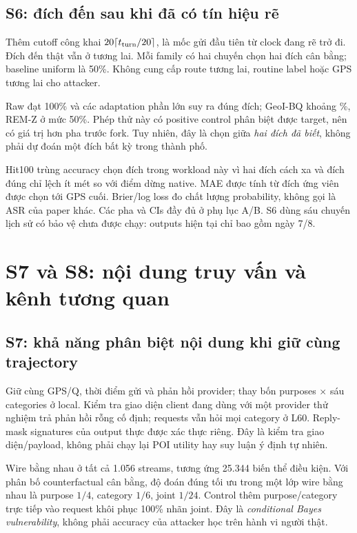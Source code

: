 \documentclass[10pt,a4paper]{article}
\begin{document}
\subsection{S6: đích đến sau khi đã có tín hiệu rẽ}
Thêm cutoff công khai $20\lceil t_{\rm turn}/20\rceil$, là mốc gửi đầu tiên từ clock đang rẽ trở đi.
Đích đến thật vẫn ở tương lai. Mỗi family có hai chuyến chọn hai đích cân bằng; baseline uniform là 50\%.
Không cung cấp route tương lai, routine label hoặc GPS tương lai cho attacker.
\begin{small}\end{small}

Raw đạt 100\% và các adaptation phần lớn suy ra đúng đích; GeoI-BQ khoảng \PrimaryFuture\%,
REM-Z ở mức 50\%. Phép thử này có positive control phân biệt được target, nên có giá trị hơn pha trước fork.
Tuy nhiên, đây là chọn giữa \emph{hai đích đã biết}, không phải dự đoán một đích bất kỳ trong thành phố.

Hit100 trùng accuracy chọn đích trong workload này vì hai đích cách xa và đích đúng chỉ lệch ít mét so
với điểm dừng native. MAE được tính từ đích ứng viên được chọn tới GPS cuối. Brier/log loss đo chất lượng
probability, không gọi là ASR của paper khác. Các pha và CIs đầy đủ ở phụ lục A/B.
S6 dùng sáu chuyến lịch sử có bảo vệ chưa được chạy: outputs hiện tại chỉ bao gồm ngày 7/8.

\clearpage
\section{S7 và S8: nội dung truy vấn và kênh tương quan}
\subsection{S7: khả năng phân biệt nội dung khi giữ cùng trajectory}
Giữ cùng GPS/Q, thời điểm gửi và phản hồi provider; thay bốn purposes $\times$ sáu categories ở local.
Kiểm tra giao diện client đang dùng với một provider thử nghiệm trả phản hồi rỗng cố định;
requests vẫn hỏi mọi category ở L60. Reply-mask signatures của output thực được xác thực riêng.
Đây là kiểm tra giao diện/payload, không phải chạy lại POI utility hay suy luận ý định tự nhiên.
\begin{small}\end{small}

Wire bằng nhau ở tất cả 1.056 streams, tương ứng 25.344 biến thể điều kiện. Với phân bố counterfactual
cân bằng, độ đoán đúng tối ưu trong một lớp wire bằng nhau là purpose $1/4$, category $1/6$, joint $1/24$.
Control thêm purpose/category trực tiếp vào request khôi phục 100\% nhãn joint.
Đây là \emph{conditional Bayes vulnerability}, không phải accuracy của attacker học trên hành vi người thật.
\end{document}
